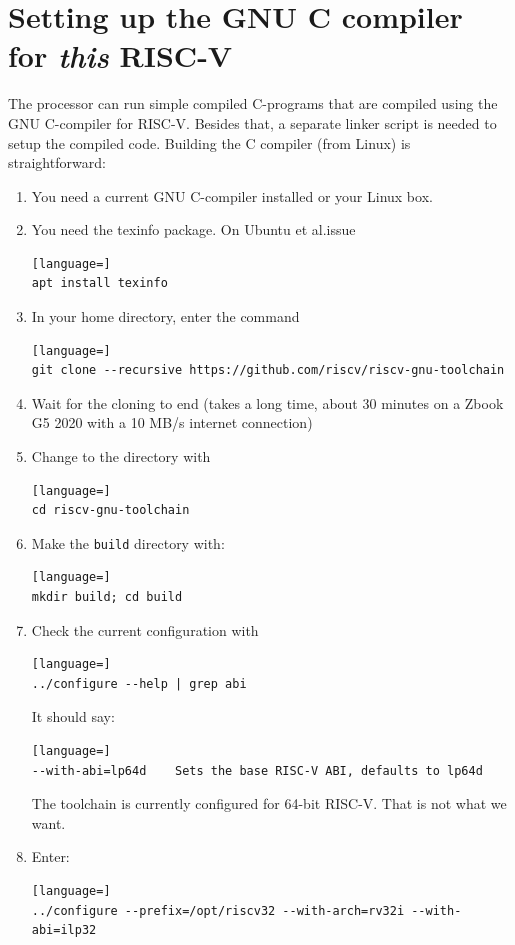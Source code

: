 \documentclass[12pt]{article}
\begin{document}
\section{Setting up the GNU C compiler for \textit{this} RISC-V}
The processor can run simple compiled C-programs that are compiled using the GNU C-compiler for RISC-V. Besides that, a separate linker script is needed to setup the compiled code. Building the C compiler (from Linux) is straightforward:

\begin{enumerate}
\item You need a current GNU C-compiler installed or your Linux box.
\item You need the texinfo package. On Ubuntu et al.\@ issue
\begin{lstlisting}[language=]
apt install texinfo
\end{lstlisting}
\item In your home directory, enter the command
\begin{lstlisting}[language=]
git clone --recursive https://github.com/riscv/riscv-gnu-toolchain
\end{lstlisting}
\item Wait for the cloning to end (takes a long time, about 30 minutes on a Zbook G5 2020 with a 10 MB/s internet connection)
\item Change to the directory with
\begin{lstlisting}[language=]
cd riscv-gnu-toolchain
\end{lstlisting}
\item Make the \texttt{build} directory with:
\begin{lstlisting}[language=]
mkdir build; cd build
\end{lstlisting}
\item Check the current configuration with
\begin{lstlisting}[language=]
../configure --help | grep abi
\end{lstlisting}
      It should say:
\begin{lstlisting}[language=]
--with-abi=lp64d    Sets the base RISC-V ABI, defaults to lp64d
\end{lstlisting}
The toolchain is currently configured for 64-bit RISC-V. That is not what we want.
\item Enter:
\begin{lstlisting}[language=]
../configure --prefix=/opt/riscv32 --with-arch=rv32i --with-abi=ilp32
\end{lstlisting}

\end{enumerate}
\end{document}
